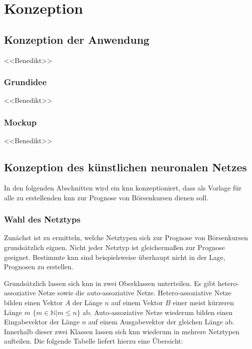 \chapter{Konzeption}
\label{chapter:Konzeption}

\section{Konzeption der Anwendung} %
\label{section:Konzeption der Anwendung} %
<<Benedikt>>

\subsection{Grundidee} %
\label{subsection:Grundidee} %
<<Benedikt>>

\subsection{Mockup} %
\label{subsection:Mockup} %
<<Benedikt>>

\section{Konzeption des künstlichen neuronalen Netzes}
\label{section:Konzeption des künstlichen neuronalen Netzes}

In den folgenden Abschnitten wird ein \acs{knn} konzeptioniert, dass als Vorlage für alle zu erstellenden \acs{knn} zur Prognose von Börsenkursen dienen soll. 

\subsection{Wahl des Netztyps}
\label{subsection:Wahl des Netztyps}
Zunächst ist zu ermitteln, welche Netztypen sich zur Prognose von Börsenkursen grundsätzlich eignen. Nicht jeder Netztyp ist gleichermaßen zur Prognose geeignet. Bestimmte \acs{knn} sind beispielsweise überhaupt nicht in der Lage, Prognosen zu erstellen. 

Grundsätzlich lassen sich \acs{knn} in zwei Oberklassen unterteilen. Es gibt hetero-assoziative Netze sowie die auto-assoziative Netze. Hetero-assoziative Netze bilden einen Vektor $A$ der Länge $n$ auf einem Vektor $B$ einer meist kürzeren Länge $m$ $\{m \in \mathbb{N} | m \le n\}$ ab. Auto-assoziative Netze wiederum bilden einen Eingabevektor der Länge $n$ auf einem Ausgabevektor der gleichen Länge ab. Innerhalb dieser zwei Klassen lassen sich \acs{knn} wiederum in mehrere Netztypen aufteilen. Die folgende Tabelle liefert hierzu eine Übersicht:

